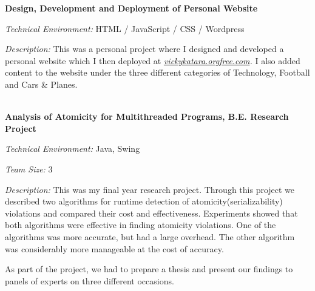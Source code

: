 \documentclass[a4paper,12pt,final]{memoir}
\newcommand{\SmallSep}{\vspace{0.5em}}
\newcommand{\CVItem}[1]
	{\textbf{\color{Plum} #1}}
\begin{document}
\CVItem{Design, Development and Deployment of Personal Website}\SmallSep\\
\begin{minipage}{13cm}
	\begin{compactitem}[\color{Plum}$\circ$]
		{\footnotesize
			\item \emph{Technical Environment:} HTML / JavaScript / CSS / Wordpress
			\item \emph{Description:} This was a personal project where I designed and developed a personal website which I then deployed at \emph{\href{http://vickykatara.orgfree.com/}{vickykatara.orgfree.com}.} I also added content to the website under the three different categories of Technology, Football and Cars \& Planes.
		}
	\end{compactitem}
\end{minipage}
\SmallSep\\

\CVItem{Analysis of Atomicity for Multithreaded Programs, B.E. Research Project}\SmallSep\\
\begin{minipage}{13cm}
	\begin{compactitem}[\color{Plum}$\circ$]
		{\footnotesize
			\item \emph{Technical Environment:} Java\texttrademark , Swing
			\item \emph{Team Size:} 3
			\item \emph{Description:} This was my final year research project. Through this project we described two algorithms for runtime detection of atomicity(serializability) violations and compared their cost and effectiveness. Experiments showed that both algorithms were effective in finding atomicity violations. One of the algorithms was more accurate, but had a large overhead. The other algorithm was considerably more manageable at the cost of accuracy.
			
			As part of the project, we had to prepare a thesis and present our findings to panels of experts on three different occasions.
		}
	\end{compactitem}
\end{minipage}
\SmallSep\\
\end{document}
